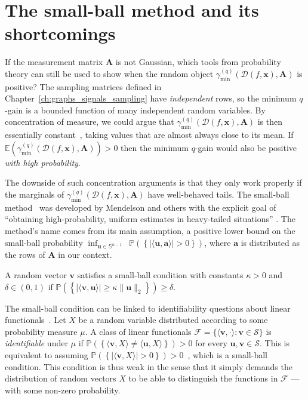 \section{The small-ball method and its shortcomings}

If the measurement matrix $\mathbf{A}$ is not Gaussian, which tools from probability theory can still be used to show when the random object $\gamma_{\min}^{(q)} \left ( \mathcal{D}( f, \mathbf{x}), \mathbf{A} \right )$ is positive? The sampling matrices defined in Chapter~\ref{ch:graphs_signals_sampling} have \emph{independent} rows, so the minimum $q$-gain is a bounded function of many independent random variables. By concentration of measure, we could argue that $\gamma_{\min}^{(q)} \left ( \mathcal{D}( f, \mathbf{x}), \mathbf{A} \right )$ is then essentially constant~\cite{talagrand1996}, taking values that are almost always close to its mean. If $\mathbb{E} \left ( \gamma_{\min}^{(q)} \left ( \mathcal{D}( f, \mathbf{x}), \mathbf{A} \right ) \right ) > 0$ then the minimum $q$-gain would also be positive \emph{with high probability}.

The downside of such concentration arguments is that they only work properly if the marginals of $\gamma_{\min}^{(q)} \left ( \mathcal{D}( f, \mathbf{x}), \mathbf{A} \right )$ have well-behaved tails. The small-ball method~\cite{mendelson2015, koltchinskii2015} was developed by Mendelson and others with the explicit goal of ``obtaining high-probability, uniform estimates in heavy-tailed situations'' \cite[p. 7]{mendelson2018}. The method's name comes from its main assumption, a positive lower bound on the small-ball probability $\inf_{\mathbf{u} \in \mathbb{S}^{n-1}} \enspace \mathbb{P} \left ( \left \{ |\langle \mathbf{u}, \mathbf{a} \rangle| > 0\right \}\right )$, where $\mathbf{a}$ is distributed as the rows of $\mathbf{A}$ in our context.

\begin{definition}\label{def:small-ball-condition}
    A random vector $\mathbf{v}$ satisfies a small-ball condition with constants $\kappa > 0$ and $\delta \in  (0,1)$ if $\mathbb{P} \left ( \left \{  |\langle \mathbf{v}, \mathbf{u} \rangle| \geq \kappa \| \mathbf{u} \|_2 \right \}\right ) \geq \delta$.
\end{definition}

The small-ball condition can be linked to identifiability questions about linear functionals~\cite{lecue2018, lecue2017a}. Let $X$ be a random variable distributed according to some probability measure $\mu$. A class of linear functionals $\mathcal{F} = \{ \langle \mathbf{v}, \cdot \rangle : \mathbf{v} \in \mathcal{S}\}$ is \emph{identifiable} under $\mu$ if $\mathbb{P} \left ( \left \{ \langle \mathbf{v}, X \rangle \neq \langle \mathbf{u}, X \rangle \right \}\right ) > 0$ for every $\mathbf{u}, \mathbf{v} \in \mathcal{S}$. This is equivalent to assuming $\mathbb{P} \left ( \left \{ |\langle \mathbf{v}, X \rangle| > 0\right \}\right ) > 0$~\cite{lecue2018, lecue2017a}, which is a small-ball condition. This condition is thus weak in the sense that it simply demands the distribution of random vectors $X$ to be able to distinguish the functions in $\mathcal{F}$ --- with some non-zero probability.

